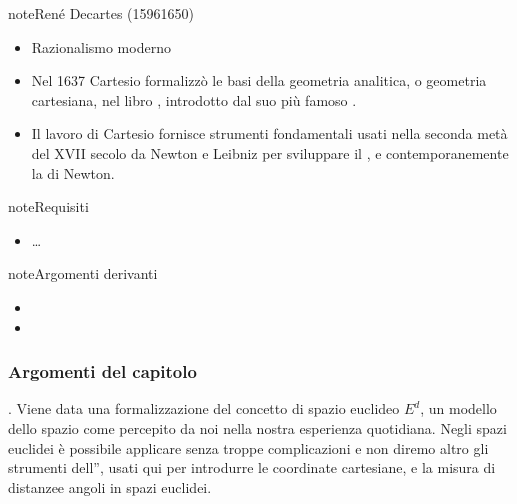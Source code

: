 \documentclass[letterpaper,10pt,italian]{jupyterBook}
\begin{document}
\begin{sphinxadmonition}{note}{René Decartes (1596\sphinxhyphen{}1650) }
\begin{itemize}
\item {} 
\sphinxAtStartPar
Razionalismo moderno

\item {} 
\sphinxAtStartPar
Nel 1637 Cartesio formalizzò le basi della geometria analitica, o geometria cartesiana, nel libro , introdotto dal suo più famoso .

\item {} 
\sphinxAtStartPar
Il lavoro di Cartesio fornisce strumenti fondamentali usati nella seconda metà del XVII secolo da Newton e Leibniz per sviluppare il {\hyperref[\detokenize{ch/calculus:math-hs-calculus}]{}}, e contemporanemente la  di Newton.

\end{itemize}
\end{sphinxadmonition}



\begin{sphinxadmonition}{note}{Requisiti}
\begin{itemize}
\item {} 
\sphinxAtStartPar
…

\end{itemize}
\end{sphinxadmonition}

\begin{sphinxadmonition}{note}{Argomenti derivanti}
\begin{itemize}
\item {} 
\sphinxAtStartPar
{}

\item {} 
\sphinxAtStartPar
{}

\end{itemize}
\end{sphinxadmonition}
\subsubsection*{Argomenti del capitolo}

\sphinxAtStartPar
{\hyperref[\detokenize{ch/analytic_geometry/euclidean_space:geometry-analytic-euclidean-space}]{}}. Viene data una formalizzazione del concetto di spazio euclideo \(E^d\), un modello dello spazio come percepito da noi nella nostra esperienza quotidiana. Negli spazi euclidei è possibile applicare senza troppe complicazioni \sphinxhyphen{} e non diremo altro \sphinxhyphen{} gli strumenti dell”{\hyperref[\detokenize{ch/algebra/vector-algebra:math-hs-algebra-vector}]{}}, usati qui per introdurre le coordinate cartesiane, e la misura di distanzee angoli in spazi euclidei.
\end{document}
